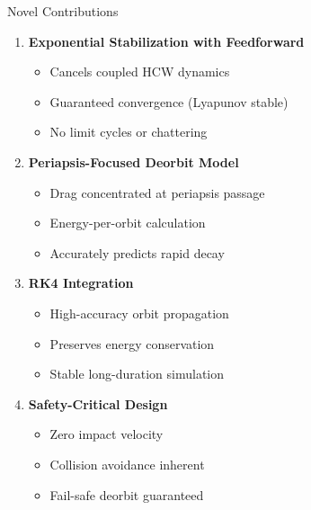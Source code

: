 \documentclass[aspectratio=169]{beamer}
\begin{document}
\begin{frame}{Novel Contributions}
\begin{enumerate}
    \item \textbf{Exponential Stabilization with Feedforward}
    \begin{itemize}
        \item Cancels coupled HCW dynamics
        \item Guaranteed convergence (Lyapunov stable)
        \item No limit cycles or chattering
    \end{itemize}

    \item \textbf{Periapsis-Focused Deorbit Model}
    \begin{itemize}
        \item Drag concentrated at periapsis passage
        \item Energy-per-orbit calculation
        \item Accurately predicts rapid decay
    \end{itemize}

    \item \textbf{RK4 Integration}
    \begin{itemize}
        \item High-accuracy orbit propagation
        \item Preserves energy conservation
        \item Stable long-duration simulation
    \end{itemize}

    \item \textbf{Safety-Critical Design}
    \begin{itemize}
        \item Zero impact velocity
        \item Collision avoidance inherent
        \item Fail-safe deorbit guaranteed
    \end{itemize}
\end{enumerate}
\end{frame}
\end{document}
